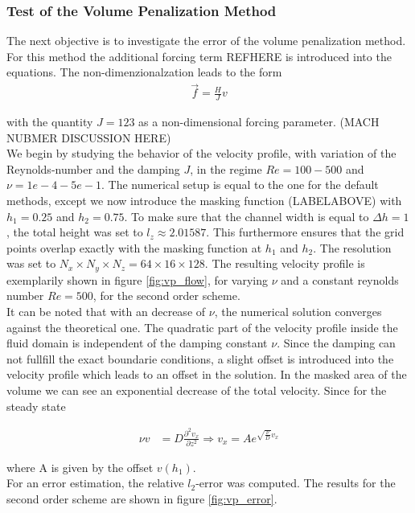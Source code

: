 \subsubsection{Test of the Volume Penalization Method}

The next objective is to investigate the error of the volume penalization method.
For this method the additional forcing term REFHERE is introduced into the equations. The non-dimenzionalzation leads to the form
\begin{align}
    \vec{f} = \frac{H}{J}v
\end{align}

with the quantity $J = 123$ as a non-dimensional forcing parameter.
(MACH NUBMER DISCUSSION HERE) \\
We begin by studying the behavior of the velocity profile, with variation of the Reynolds-number and the damping $J$, in the regime $Re=100-500$ and $\nu=1e-4 - 5e-1$.
The numerical setup is equal to the one for the default methods, except we now introduce the masking function (LABELABOVE) with $h_1=0.25$ and $h_2=0.75$.
To make sure that the channel width is equal to $\Delta h = 1$, the total height was set to $l_z\approx2.01587$. This furthermore ensures that the grid points overlap exactly
with the masking function at $h_1$ and $h_2$. The resolution was set to $N_x\times N_y\times N_z = 64\times16\times128$.
The resulting velocity profile is exemplarily shown in figure \ref{fig:vp_flow}, for varying $\nu$ and a constant reynolds number $Re=500$, for the second order scheme.\\
It can be noted that with an decrease of $\nu$, the numerical solution converges against the theoretical one.
The quadratic part of the velocity profile inside the fluid domain is independent of the damping constant $\nu$.
Since the damping can not fullfill the exact boundarie conditions, a slight offset is introduced into the velocity profile
which leads to an offset in the solution.
In the masked area of the volume we can see an exponential decrease of the total velocity.
Since for the steady state

\begin{align}
 \nu v &= D \frac{\partial^2 v_x}{\partial z^2}  \Rightarrow  v_x = A e^{\sqrt{\frac{\nu}{D}}v_x}
\end{align}

where A is given by the offset $v(h_1)$.\\
For an error estimation, the relative $l_2$-error was computed.
The results for the second order scheme are shown in figure \ref{fig:vp_error}.

